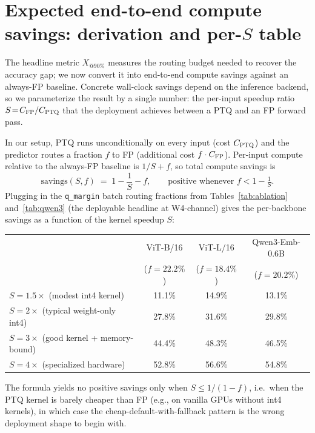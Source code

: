 \documentclass{article}
\makeatletter
\newcommand{\fp}{\textsc{FP}\xspace}
\newcommand{\ptq}{\textsc{PTQ}\xspace}
\newcommand{\xat}[1]{\ensuremath{X_{@#1\%}}}
\makeatother
\begin{document}
\section{Expected end-to-end compute savings: derivation and per-$S$ table}\label{app:savings}

The headline metric \xat{90} measures the routing budget needed to recover the accuracy gap; we now convert it into end-to-end compute savings against an always-\fp{} baseline. Concrete wall-clock savings depend on the inference backend, so we parameterize the result by a single number: the per-input speedup ratio $S \!=\! C_{\fp{}} / C_{\ptq{}}$ that the deployment achieves between a \ptq{} and an \fp{} forward pass.

In our setup, \ptq{} runs unconditionally on every input (cost $C_{\ptq{}}$) and the predictor routes a fraction $f$ to \fp{} (additional cost $f \cdot C_{\fp{}}$). Per-input compute relative to the always-\fp{} baseline is $1/S + f$, so total compute savings is
\[
\mathrm{savings}(S, f) \;=\; 1 - \frac{1}{S} - f, \qquad \text{positive whenever } f < 1 - \tfrac{1}{S}.
\]
Plugging in the \texttt{q\_margin} batch routing fractions from Tables~\ref{tab:ablation} and~\ref{tab:qwen3} (the deployable headline at W4-channel) gives the per-backbone savings as a function of the kernel speedup $S$:

\begin{center}
\small
\begin{tabular}{lccc}
\toprule
& ViT-B/16 & ViT-L/16 & Qwen3-Emb-0.6B \\
& ($f = 22.2\%$) & ($f = 18.4\%$) & ($f = 20.2\%$) \\
\midrule
$S = 1.5\times$ (modest int4 kernel)        & 11.1\% & 14.9\% & 13.1\% \\
$S = 2\times$  (typical weight-only int4)   & 27.8\% & 31.6\% & 29.8\% \\
$S = 3\times$  (good kernel + memory-bound) & 44.4\% & 48.3\% & 46.5\% \\
$S = 4\times$  (specialized hardware)       & 52.8\% & 56.6\% & 54.8\% \\
\bottomrule
\end{tabular}
\end{center}

The formula yields no positive savings only when $S \!\leq\! 1/(1-f)$, i.e.\ when the \ptq{} kernel is barely cheaper than \fp{} (e.g., on vanilla GPUs without int4 kernels), in which case the cheap-default-with-fallback pattern is the wrong deployment shape to begin with.
\end{document}

